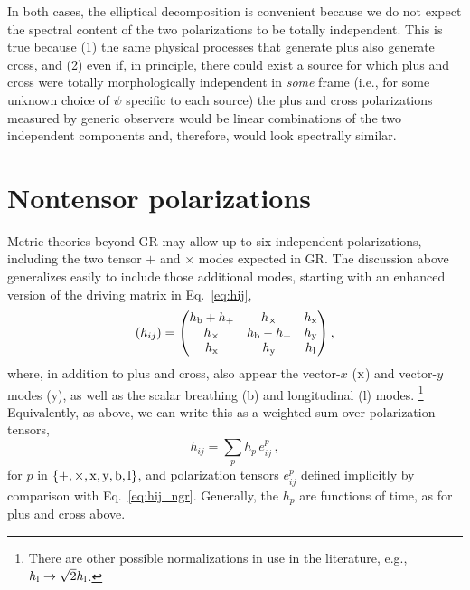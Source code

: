 \documentclass[aps,prd,twocolumn,superscriptaddress,preprintnumbers,floatfix,nofootinbib]{revtex4-2}
\newcommand{\beq}{\begin{equation}}
\newcommand{\eeq}{\end{equation}}
\begin{document}
In both cases, the elliptical decomposition is convenient because we do not expect the spectral content of the two polarizations to be totally independent.
This is true because (1) the same physical processes that generate plus also generate cross, and (2) even if, in principle, there could exist a source for which plus and cross were totally morphologically independent in \emph{some} frame (i.e., for some unknown choice of $\psi$ specific to each source) the plus and cross polarizations measured by generic observers would be linear combinations of the two independent components and, therefore, would look spectrally similar.

\section{Nontensor polarizations}

\newcommand{\xsym}{\ensuremath{\rm x}}
\newcommand{\ysym}{{\rm y}}
\newcommand{\bsym}{{\rm b}}
\newcommand{\lsym}{{\rm l}}
\newcommand{\hx}{h_{\xsym}}
\newcommand{\hy}{h_{\ysym}}
\newcommand{\hb}{h_{\bsym}}
\newcommand{\hlon}{h_{\lsym}}

Metric theories beyond GR may allow up to six independent polarizations, including the two tensor $+$ and $\times$ modes expected in GR.
The discussion above generalizes easily to include those additional modes, starting with an enhanced version of the driving matrix in Eq.~\eqref{eq:hij},
\beq \label{eq:hij_ngr}
(h_{ij}) = \begin{pmatrix}
\hb + h_+ & h_\times  & \hx  \\
h_\times  & \hb - h_+ & \hy  \\
\hx    & \hy    & \hlon
\end{pmatrix} ,
\eeq
where, in addition to plus and cross, also appear the vector-$x$ (\xsym) and vector-$y$ modes (\ysym), as well as the scalar breathing (\bsym) and longitudinal (\lsym) modes.%
\footnote{There are other possible normalizations in use in the literature, e.g., $\hlon \to \sqrt{2} \hlon$.}
Equivalently, as above, we can write this as a weighted sum over polarization tensors,
\beq
h_{ij} = \sum_p h_p\, e^p_{ij} \, ,
\eeq
for $p$ in $\{+,\times, \xsym, \ysym, \bsym, \lsym\}$, and polarization tensors $e^p_{ij}$ defined implicitly by comparison with Eq.~\eqref{eq:hij_ngr}.
Generally, the $h_p$ are functions of time, as for plus and cross above.
\end{document}
